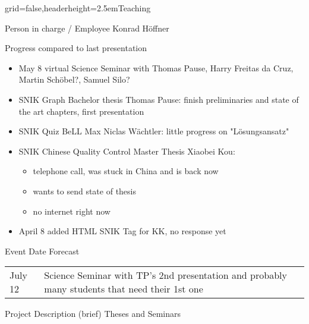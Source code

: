 \documentclass[]{kiesgrube}
\begin{document}
\begin{poster}%
{grid=false,headerheight=2.5em}{}{Teaching}{}

\begin{posterbox}[name=person,column=0,row=0]{Person in charge / Employee}
Konrad Höffner
\end{posterbox}
\begin{posterbox}[name=progress,below=person]{Progress compared to last presentation}
\small
\begin{itemize}
\item May 8 virtual Science Seminar with Thomas Pause, Harry Freitas da Cruz, Martin Schöbel?, Samuel Silo?
\item SNIK Graph Bachelor thesis Thomas Pause: finish preliminaries and state of the art chapters, first presentation
\item SNIK Quiz BeLL Max Niclas Wächtler: little progress on "Lösungsansatz"
\item SNIK Chinese Quality Control Master Thesis Xiaobei Kou:
\begin{itemize}
\item telephone call, was stuck in China and is back now
\item wants to send state of thesis
\item no internet right now
\end{itemize}
\item April 8 added HTML SNIK Tag for KK, no response yet
\end{itemize}
\end{posterbox}
\begin{posterbox}[name=event,below=progress]{Event Date Forecast}
\begin{tabulary}{\textwidth}{lL}
July 12 	&Science Seminar with TP's 2nd presentation and probably many students that need their 1st one\\
\end{tabulary}
\end{posterbox}
\begin{posterbox}[name=description,column=1,row=0]{Project Description (brief)}
Theses and Seminars
\end{posterbox}

\end{poster}
\end{document}
